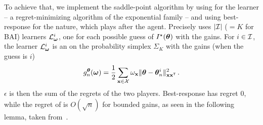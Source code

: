 
To achieve that, we implement the saddle-point algorithm by using \AH for the learner -- a regret-minimizing algorithm of the exponential family -- and using best-response for the nature, which plays after the agent. Precisely \LG{} uses $|\mathcal{I}|$ ($=K$ for BAI) learners $\mathcal{L}_{\boldsymbol \omega}^i$, one for each possible guess of $I^\star({\boldsymbol \theta})$ with the gains. For $i\in\mathcal{I}$, the learner $\mathcal{L}_{\boldsymbol \omega}^i$ is an \AH on the probability simplex $\Sigma_K$ with the gains (when the guess is $i$)
\[
    g_n^{\boldsymbol \theta}({\boldsymbol \omega}) = \frac{1}{2} \sum_{{\bf x}\in\mathcal{X}}  \omega_{{\bf x}} \Vert {\boldsymbol \theta} - {\boldsymbol \theta}_n^i \Vert^2_{{\bf x} {\bf x}^\mathsf{\scriptscriptstyle T}}\,.
\]
$\epsilon$ is then the sum of the regrets of the two players. Best-response has regret 0, while the regret of \AH is $O(\sqrt{n})$ for bounded gains, as seen in the following lemma, taken from~\citet{derooij2014hedge}.

